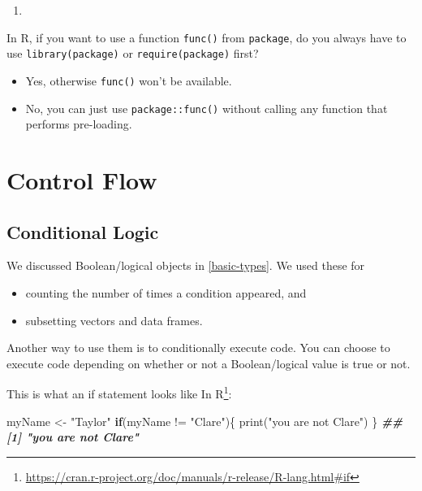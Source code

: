 \documentclass[
  12pt,
  krantz2]{krantz}
\makeatletter
\newenvironment{Shaded}{\begin{snugshade}}{\end{snugshade}}
\newcommand{\ControlFlowTok}[1]{\textcolor[rgb]{0.27,0.27,0.27}{\textbf{#1}}}
\newcommand{\DocumentationTok}[1]{\textcolor[rgb]{0.37,0.37,0.37}{\textbf{\textit{#1}}}}
\newcommand{\FunctionTok}[1]{\textcolor[rgb]{0,0,0}{#1}}
\newcommand{\NormalTok}[1]{#1}
\newcommand{\OtherTok}[1]{\textcolor[rgb]{0.37,0.37,0.37}{#1}}
\newcommand{\SpecialCharTok}[1]{\textcolor[rgb]{0,0,0}{#1}}
\newcommand{\StringTok}[1]{\textcolor[rgb]{0.5,0.5,0.5}{#1}}
\providecommand{\tightlist}{%
  \setlength{\itemsep}{0pt}\setlength{\parskip}{0pt}}
\renewcommand{\href}[2]{#2\footnote{\url{#1}}}
\newenvironment{kframe}{%
\medskip{}
\setlength{\fboxsep}{.8em}
 \def\at@end@of@kframe{}%
 \ifinner\ifhmode%
  \def\at@end@of@kframe{\end{minipage}}%
  \begin{minipage}{\columnwidth}%
 \fi\fi%
 \def\FrameCommand##1{\hskip\@totalleftmargin \hskip-\fboxsep
 \colorbox{shadecolor}{##1}\hskip-\fboxsep
     \hskip-\linewidth \hskip-\@totalleftmargin \hskip\columnwidth}%
 \MakeFramed {\advance\hsize-\width
   \@totalleftmargin\z@ \linewidth\hsize
   \@setminipage}}%
 {\par\unskip\endMakeFramed%
 \at@end@of@kframe}
\renewenvironment{Shaded}{\begin{kframe}}{\end{kframe}}
\makeatother
\begin{document}
\begin{enumerate}
\def\labelenumi{\arabic{enumi}.}
\setcounter{enumi}{4}
\tightlist
\item
\end{enumerate}

In R, if you want to use a function \texttt{func()} from \texttt{package}, do you always have to use \texttt{library(package)} or \texttt{require(package)} first?

\begin{itemize}
\tightlist
\item
  Yes, otherwise \texttt{func()} won't be available.
\item
  No, you can just use \texttt{package::func()} without calling any function that performs pre-loading.
\end{itemize}

\hypertarget{control-flow}{%
\chapter{Control Flow}\label{control-flow}}

\hypertarget{conditional-logic}{%
\section{Conditional Logic}\label{conditional-logic}}

We discussed Boolean/logical objects in \ref{basic-types}. We used these for

\begin{itemize}
\tightlist
\item
  counting the number of times a condition appeared, and
\item
  subsetting vectors and data frames.
\end{itemize}

Another way to use them is to conditionally execute code. You can choose to execute code depending on whether or not a Boolean/logical value is true or not.

This is what an \href{https://cran.r-project.org/doc/manuals/r-release/R-lang.html\#if}{if statement looks like In R}:

\begin{Shaded}
\begin{Highlighting}[]
\NormalTok{myName }\OtherTok{\textless{}{-}} \StringTok{"Taylor"}
\ControlFlowTok{if}\NormalTok{(myName }\SpecialCharTok{!=} \StringTok{"Clare"}\NormalTok{)\{}
  \FunctionTok{print}\NormalTok{(}\StringTok{"you are not Clare"}\NormalTok{)}
\NormalTok{\}}
\DocumentationTok{\#\# [1] "you are not Clare"}
\end{Highlighting}
\end{Shaded}
\end{document}
